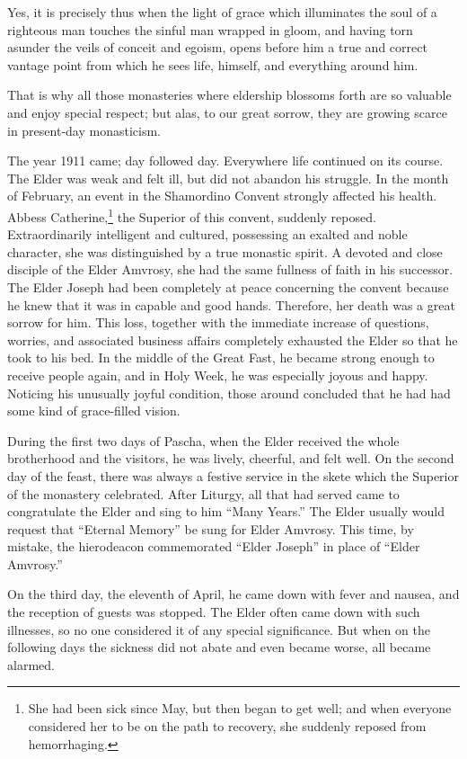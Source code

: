 Yes, it is precisely thus when the light of grace which illuminates the soul of a righteous man touches the sinful man wrapped in gloom, and having torn asunder the veils of conceit and egoism, opens before him a true and correct vantage point from which he sees life, himself, and everything around him.

That is why all those monasteries where eldership blossoms forth are so valuable and enjoy special respect; but alas, to our great sorrow, they are growing scarce in present-day monasticism.

The year 1911 came; day followed day. Everywhere life continued on its course. The Elder was weak and felt ill, but did not abandon his struggle. In the month of February, an event in the Shamordino Convent strongly affected his health. Abbess Catherine,\footnote{She had been sick since May, but then began to get well; and when everyone considered her to be on the path to recovery, she suddenly reposed from hemorrhaging.} the Superior of this convent, suddenly reposed. Extraordinarily intelligent and cultured, possessing an exalted and noble character, she was distinguished by a true monastic spirit. A devoted and close disciple of the Elder Amvrosy, she had the same fullness of faith in his successor. The Elder Joseph had been completely at peace concerning the convent because he knew that it was in capable and good hands. Therefore, her death was a great sorrow for him. This loss, together with the immediate increase of questions, worries, and associated business affairs completely exhausted the Elder so that he took to his bed. In the middle of the Great Fast, he became strong enough to receive people again, and in Holy Week, he was especially joyous and happy. Noticing his unusually joyful condition, those around concluded that he had had some kind of grace-filled vision.

During the first two days of Pascha, when the Elder received the whole brotherhood and the visitors, he was lively, cheerful, and felt well. On the second day of the feast, there was always a festive service in the skete which the Superior of the monastery celebrated. After Liturgy, all that had served came to congratulate the Elder and sing to him ``Many Years.'' The Elder usually would request that ``Eternal Memory'' be sung for Elder Amvrosy. This time, by mistake, the hierodeacon commemorated ``Elder Joseph'' in place of ``Elder Amvrosy.''

On the third day, the eleventh of April, he came down with fever and nausea, and the reception of guests was stopped. The Elder often came down with such illnesses, so no one considered it of any special significance. But when on the following days the sickness did not abate and even became worse, all became alarmed.

